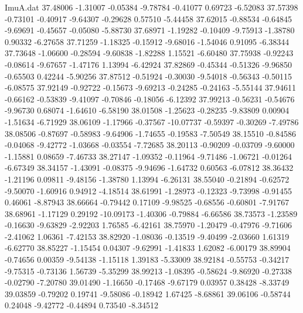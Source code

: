 \begin{filecontents}{ImuA.dat}
  37.48006   -1.31007   -0.05384   -9.78784   -0.41077    0.69723   -6.52083
  37.57398   -0.73101   -0.40917   -9.64307   -0.29628    0.57510   -5.44458
  37.62015   -0.88534   -0.64845   -9.69691   -0.45657   -0.05080   -5.88730
  37.68971   -1.19282   -0.10409   -9.75913   -1.38780    0.90332   -6.27658
  37.71259   -1.18325   -0.15912   -9.68016   -1.54046    0.91095   -6.38344
  37.73648   -1.06600   -0.28594   -9.60838   -1.82288    1.15521   -6.60480
  37.75938   -0.92243   -0.08614   -9.67657   -1.47176    1.13994   -6.42924
  37.82869   -0.45344   -0.51326   -9.96850   -0.65503    0.42244   -5.90256
  37.87512   -0.51924   -0.30030   -9.54018   -0.56343   -0.50115   -6.08575
  37.92149   -0.92722   -0.15673   -9.69213   -0.24285   -0.24163   -5.55144
  37.94611   -0.66162   -0.53839   -9.41097   -0.70846   -0.18056   -6.12392
  37.99213   -0.56231   -0.54676   -9.96730    0.68074   -1.64610   -6.58190
  38.01508   -1.25623   -0.28235   -9.83809    0.00904   -1.51634   -6.71929
  38.06109   -1.17966   -0.37567  -10.07737   -0.59397   -0.30269   -7.49786
  38.08506   -0.87697   -0.58983   -9.64906   -1.74655   -0.19583   -7.50549
  38.15510   -0.84586   -0.04068   -9.42772   -1.03668   -0.03554   -7.72685
  38.20113   -0.90209   -0.03709   -9.60000   -1.15881    0.08659   -7.46733
  38.27147   -1.09352   -0.11964   -9.71486   -1.06721   -0.01264   -6.67349
  38.34157   -1.43091   -0.08375   -9.94696   -1.64732    0.60563   -6.07812
  38.36432   -1.21196    0.09811   -9.48156   -1.38780    1.13994   -6.26131
  38.55040   -0.21894   -0.62572   -9.50070   -1.60916    0.94912   -4.18514
  38.61991   -1.28973   -0.12323   -9.73998   -0.91455    0.46061   -8.87943
  38.66664   -0.79442    0.17109   -9.98525   -0.68556   -0.60801   -7.91767
  38.68961   -1.17129    0.29192  -10.09173   -1.40306   -0.79884   -6.66586
  38.73573   -1.23589   -0.16630   -9.63829   -2.92203    1.76585   -6.42161
  38.75970   -1.20479   -0.47976   -9.71606   -2.41062    1.06361   -7.42153
  38.82920   -1.08036   -0.13519   -9.40499   -2.03660    1.61319   -6.62770
  38.85227   -1.15454    0.04307   -9.62991   -1.41833    1.62082   -6.00179
  38.89904   -0.74656    0.00359   -9.54138   -1.15118    1.39183   -5.33009
  38.92184   -0.55753   -0.34217   -9.75315   -0.73136    1.56739   -5.35299
  38.99213   -1.08395   -0.58624   -9.86920   -0.27338   -0.02790   -7.20780
  39.01490   -1.16650   -0.17468   -9.67179    0.03957    0.38428   -8.33749
  39.03859   -0.79202    0.19741   -9.58086   -0.18942    1.67425   -8.68861
  39.06106   -0.58744    0.24048   -9.42772   -0.44894    0.73540   -8.34512

\end{filecontents}
